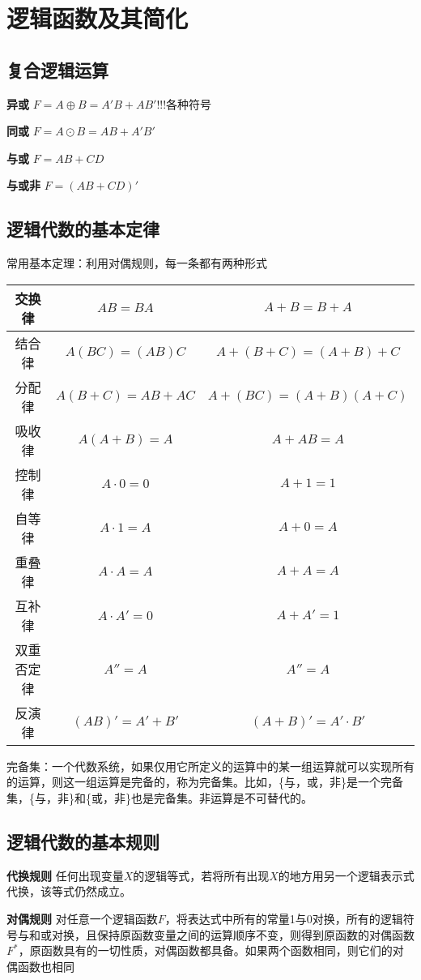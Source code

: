 \documentclass{ctexart}
\newcommand*{\noindbf}[1]{{\noindent \bf{#1} \qquad}}
\begin{document}
\section{逻辑函数及其简化}
\subsection{复合逻辑运算}
\noindbf{异或} $F=A\oplus B=A'B+AB'$!!!各种符号

\noindbf{同或} $F=A\odot B=AB+A'B'$

\noindbf{与或} $F=AB+CD$

\noindbf{与或非} $F=(AB+CD)'$
\subsection{逻辑代数的基本定律}
常用基本定理：利用对偶规则，每一条都有两种形式
\begin{table}[H]
    \centering
    \begin{tabular}{|c|c|c|}
        \hline
        交换律&$AB=BA$&$A+B=B+A$\\ \hline
        结合律&$A(BC)=(AB)C$&$A+(B+C)=(A+B)+C$\\ \hline
        分配律&$A(B+C)=AB+AC$&$A+(BC)=(A+B)(A+C)$\\ \hline
        吸收律&$A(A+B)=A$&$A+AB=A$\\ \hline
        控制律&$A\cdot 0=0$&$A+1=1$\\ \hline
        自等律&$A\cdot 1=A$&$A+ 0=A$\\ \hline
        重叠律&$A\cdot A=A$&$A+A=A$\\ \hline
        互补律&$A\cdot A'=0$&$A+A'=1$\\ \hline
        双重否定律&$A''=A$&$A''=A$\\ \hline
        反演律&$(AB)'=A'+B'$&$(A+B)'=A'\cdot B'$\\ \hline
    \end{tabular}
\end{table}
完备集：一个代数系统，如果仅用它所定义的运算中的某一组运算就可以实现所有的运算，则这一组运算是完备的，称为完备集。比如，\{与，或，非\}是一个完备集，\{与，非\}和\{或，非\}也是完备集。非运算是不可替代的。
\subsection{逻辑代数的基本规则}
\noindbf{代换规则}任何出现变量$X$的逻辑等式，若将所有出现$X$的地方用另一个逻辑表示式代换，该等式仍然成立。

\noindbf{对偶规则}对任意一个逻辑函数$F$，将表达式中所有的常量1与0对换，所有的逻辑符号与和或对换，且保持原函数变量之间的运算顺序不变，则得到原函数的对偶函数$F^*$，原函数具有的一切性质，对偶函数都具备。如果两个函数相同，则它们的对偶函数也相同
\end{document}
